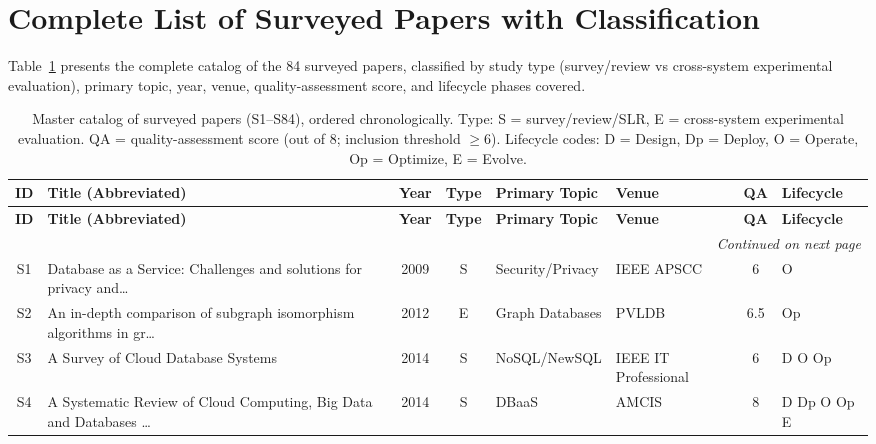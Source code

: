 \documentclass[a4paper,fleqn]{cas-sc}
\begin{document}
\appendix
\section{Complete List of Surveyed Papers with Classification}
\label{app:catalog}

Table~\ref{tab:catalog} presents the complete catalog of the 84 surveyed papers, classified by study type (survey/review vs cross-system experimental evaluation), primary topic, year, venue, quality-assessment score, and lifecycle phases covered.

\begin{landscape}
\begingroup\setlength{\tabcolsep}{4pt}%
\begin{longtable}{c p{3.5cm} c c p{2.45cm} p{2.3cm} c p{1.5cm}}
\caption{Master catalog of surveyed papers (S1--S84), ordered chronologically. Type: S = survey/review/SLR, E = cross-system experimental evaluation. QA = quality-assessment score (out of 8; inclusion threshold $\geq$6). Lifecycle codes: D = Design, Dp = Deploy, O = Operate, Op = Optimize, E = Evolve.} \label{tab:catalog} \\
\toprule
\textbf{ID} & \textbf{Title (Abbreviated)} & \textbf{Year} & \textbf{Type} & \textbf{Primary Topic} & \textbf{Venue} & \textbf{QA} & \textbf{Lifecycle} \\
\midrule
\endfirsthead
\toprule
\textbf{ID} & \textbf{Title (Abbreviated)} & \textbf{Year} & \textbf{Type} & \textbf{Primary Topic} & \textbf{Venue} & \textbf{QA} & \textbf{Lifecycle} \\
\midrule
\endhead
\midrule
\multicolumn{8}{r}{\textit{Continued on next page}} \\
\endfoot
\bottomrule
\endlastfoot
S1 & Database as a Service: Challenges and solutions for privacy and\ldots{}~\cite{Ferrari2009DBaaSSec} & 2009 & S & Security/Privacy & IEEE APSCC & 6 & O \\
\addlinespace
S2 & An in-depth comparison of subgraph isomorphism algorithms in gr\ldots{}~\cite{Lee2012GraphDB} & 2012 & E & Graph Databases & PVLDB & 6.5 & Op \\
\addlinespace
S3 & A Survey of Cloud Database Systems~\cite{Deka2014CloudDBSurvey} & 2014 & S & NoSQL/NewSQL & IEEE IT Professional & 6 & D O Op \\
\addlinespace
S4 & A Systematic Review of Cloud Computing, Big Data and Databases \ldots{}~\cite{Litchfield2014DBaaS} & 2014 & S & DBaaS & AMCIS & 8 & D Dp O Op E \\

\end{longtable}
\end{landscape}
\end{document}
